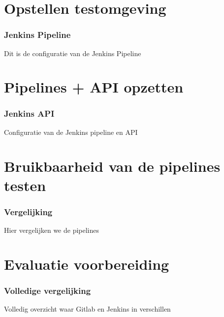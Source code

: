 \part{Opstellen testomgeving}
\section{Jenkins Pipeline}
Dit is de configuratie van de Jenkins Pipeline


\part{Pipelines + API opzetten}
\section{Jenkins API}
Configuratie van de Jenkins pipeline en API

\part{Bruikbaarheid van de pipelines testen}
\section{Vergelijking}
Hier vergelijken we de pipelines


\part{Evaluatie voorbereiding}
\section{Volledige vergelijking}
Volledig overzicht waar Gitlab en Jenkins in verschillen    